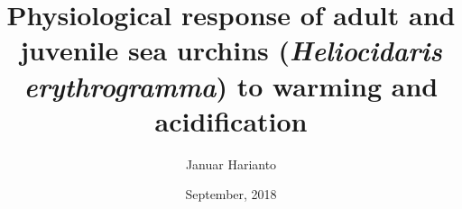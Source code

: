 

\makeglossaries


\title{Physiological response of adult and juvenile sea urchins (\textit{Heliocidaris erythrogramma}) to warming and acidification}
\author{Januar Harianto}
\date{September, 2018}


